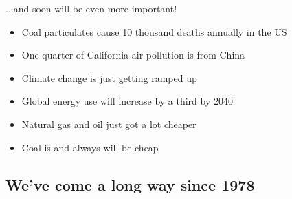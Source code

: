 \documentclass{beamer}
\begin{document}
    \begin{frame}{...and soon will be even more important!}

        \begin{itemize}

            \item Coal particulates cause 10 thousand deaths annually in the US
            \pause
            \item One quarter of California air pollution is from China
            \pause
            \item Climate change is just getting ramped up
            \pause

            \vspace{2em}

            \item Global energy use will increase by a third by 2040
            \pause
            \item Natural gas and oil just got a lot cheaper
            \pause
            \item Coal is and always will be cheap

        \end{itemize}

    \end{frame}

\subsection{We've come a long way since 1978}
\end{document}
